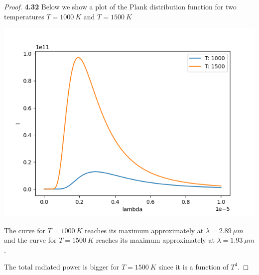 \documentclass[11pt]{article}
\theoremstyle{definition}
\begin{document}
\cleardoublepage
\begin{proof}{\textbf{4.32}}
    Below we show a plot of the Plank distribution function for two
    temperatures $T = 1000~K$ and $T = 1500~K$
    \begin{center}
        \includegraphics*[scale=0.7]{ch4-32.png}
    \end{center}
    The curve for $T = 1000~K$ reaches its maximum approximately at
    $\lambda = 2.89~\mu m$ and the curve for $T = 1500~K$ reaches its
    maximum approximately at $\lambda = 1.93~\mu m$.

    The total radiated power is bigger for $T = 1500~K$ since it is
    a function of $T^4$.
\end{proof}
\cleardoublepage
\end{document}
